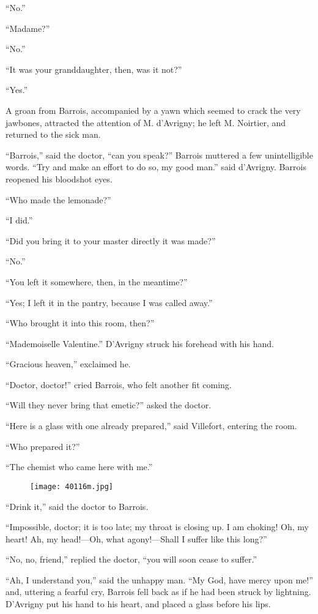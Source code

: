 “No.”

“Madame?”

“No.”

“It was your granddaughter, then, was it not?”

“Yes.”

A groan from Barrois, accompanied by a yawn which seemed to crack the
very jawbones, attracted the attention of M. d’Avrigny; he left M.
Noirtier, and returned to the sick man.

“Barrois,” said the doctor, “can you speak?” Barrois muttered a few
unintelligible words. “Try and make an effort to do so, my good man.”
said d’Avrigny. Barrois reopened his bloodshot eyes.

“Who made the lemonade?”

“I did.”

“Did you bring it to your master directly it was made?”

“No.”

“You left it somewhere, then, in the meantime?”

“Yes; I left it in the pantry, because I was called away.”

“Who brought it into this room, then?”

“Mademoiselle Valentine.” D’Avrigny struck his forehead with his hand.

“Gracious heaven,” exclaimed he.

“Doctor, doctor!” cried Barrois, who felt another fit coming.

“Will they never bring that emetic?” asked the doctor.

“Here is a glass with one already prepared,” said Villefort, entering
the room.

“Who prepared it?”

“The chemist who came here with me.”

\begin{figure}[ht]
\texttt{[image: 40116m.jpg]}
\end{figure}

“Drink it,” said the doctor to Barrois.

“Impossible, doctor; it is too late; my throat is closing up. I am
choking! Oh, my heart! Ah, my head!—Oh, what agony!—Shall I suffer like
this long?”

“No, no, friend,” replied the doctor, “you will soon cease to suffer.”

“Ah, I understand you,” said the unhappy man. “My God, have mercy upon
me!” and, uttering a fearful cry, Barrois fell back as if he had been
struck by lightning. D’Avrigny put his hand to his heart, and placed a
glass before his lips.

